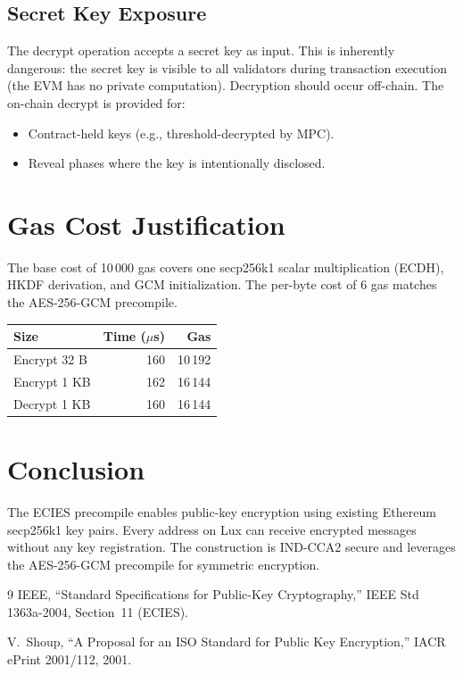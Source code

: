 \documentclass[11pt,a4paper]{article}
\begin{document}
\subsection{Secret Key Exposure}

The decrypt operation accepts a secret key as input. This is inherently
dangerous: the secret key is visible to all validators during transaction
execution (the EVM has no private computation). Decryption should occur
off-chain. The on-chain decrypt is provided for:
\begin{itemize}
  \item Contract-held keys (e.g., threshold-decrypted by MPC).
  \item Reveal phases where the key is intentionally disclosed.
\end{itemize}

\section{Gas Cost Justification}

The base cost of 10\,000 gas covers one secp256k1 scalar multiplication (ECDH),
HKDF derivation, and GCM initialization. The per-byte cost of 6 gas matches
the AES-256-GCM precompile.

\begin{table}[H]
\centering
\begin{tabular}{lrr}
\toprule
\textbf{Size} & \textbf{Time ($\mu$s)} & \textbf{Gas} \\
\midrule
Encrypt 32 B & 160 & 10\,192 \\
Encrypt 1 KB & 162 & 16\,144 \\
Decrypt 1 KB & 160 & 16\,144 \\
\bottomrule
\end{tabular}
\end{table}

\section{Conclusion}

The ECIES precompile enables public-key encryption using existing Ethereum
secp256k1 key pairs. Every address on Lux can receive encrypted messages
without any key registration. The construction is IND-CCA2 secure and
leverages the AES-256-GCM precompile for symmetric encryption.

\begin{thebibliography}{9}
  IEEE, ``Standard Specifications for Public-Key Cryptography,''
  IEEE Std 1363a-2004, Section~11 (ECIES).

  V.~Shoup, ``A Proposal for an ISO Standard for Public Key Encryption,''
  IACR ePrint 2001/112, 2001.
\end{thebibliography}
\end{document}
